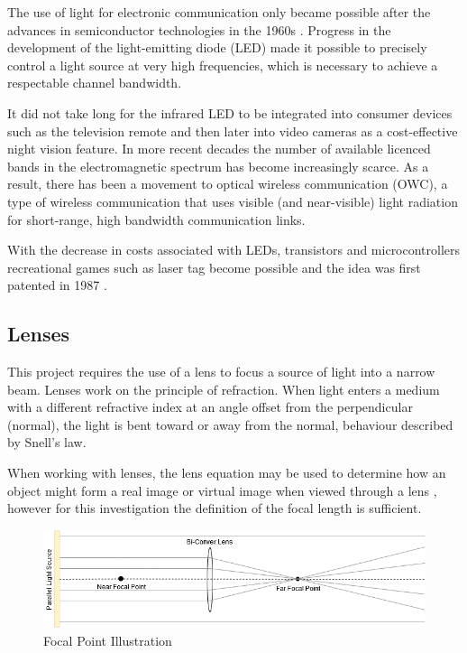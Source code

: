 
The use of light for electronic communication only became possible after the advances in semiconductor technologies in the 1960s \cite{Huurdeman2003}. Progress in the development of the light-emitting diode (LED) made it possible to precisely control a light source at very high frequencies, which is necessary to achieve a respectable channel bandwidth.

It did not take long for the infrared LED to be integrated into consumer devices such as the television remote and then later into video cameras as a cost-effective night vision feature. In more recent decades the number of available licenced bands in the electromagnetic spectrum has become increasingly scarce. As a result, there has been a movement to optical wireless communication (OWC), a type of wireless communication that uses visible (and near-visible) light radiation for short-range, high bandwidth communication links.

With the decrease in costs associated with LEDs, transistors and microcontrollers recreational games such as laser tag become possible and the idea was first patented in 1987 \cite{Carter1986}.



\subsection{Lenses}
\label{sec:lit_lenses}
This project requires the use of a lens to focus a source of light into a narrow beam. Lenses work on the principle of refraction. When light enters a medium with a different refractive index at an angle offset from the perpendicular (normal), the light is bent toward or away from the normal, behaviour described by Snell's law.

When working with lenses, the lens equation may be used to determine how an object might form a real image or virtual image when viewed through a lens \cite{Knight2013}, however for this investigation the definition of the focal length is sufficient.

\begin{figure}[H]
	\centering
	\includegraphics[width=0.8\linewidth]{figures/litreview/lens_diagram.png}
	\caption{Focal Point Illustration}
	\label{fig:lens_diagram}
\end{figure}

